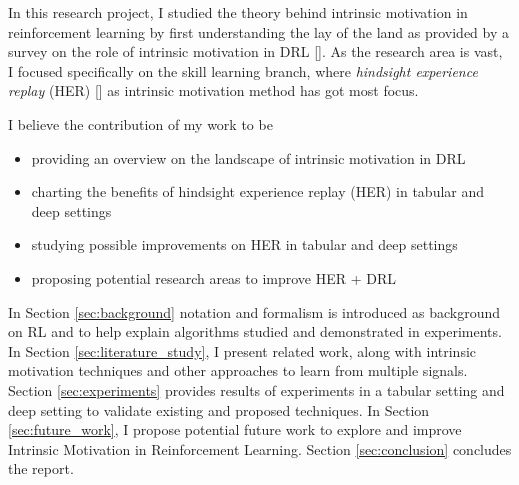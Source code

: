 \documentclass[conference]{IEEEtran}
\begin{document}
In this research project, I studied the theory behind intrinsic motivation in reinforcement learning by first understanding the lay of the land as provided by a survey on the role of intrinsic motivation in DRL [\cite{aubret2019survey}]. As the research area is vast, I focused specifically on the skill learning branch, where \textit{hindsight experience replay} (HER) [\cite{andrychowicz2017hindsight}] as intrinsic motivation method has got most focus.

I believe the contribution of my work to be
\begin{itemize}
    \item providing an overview on the landscape of intrinsic motivation in DRL
    \item charting the benefits of hindsight experience replay (HER) in tabular and deep settings
    \item studying possible improvements on HER in tabular and deep settings
    \item proposing potential research areas to improve HER + DRL
\end{itemize}{}

In Section \ref{sec:background} notation and formalism is introduced as background on RL and to help explain algorithms studied and demonstrated in experiments. In Section \ref{sec:literature_study}, I present related work, along with intrinsic motivation techniques and other approaches to learn from multiple signals. Section \ref{sec:experiments} provides results of experiments in a tabular setting and deep setting to validate existing and proposed techniques. In Section \ref{sec:future_work}, I propose potential future work to explore and improve Intrinsic Motivation in Reinforcement Learning. Section \ref{sec:conclusion} concludes the report.
\end{document}
